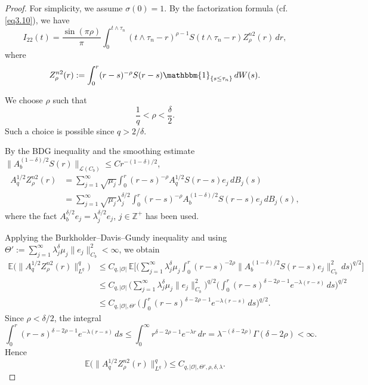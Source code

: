 \documentclass[10pt]{article}
\numberwithin{figure}{section}
\numberwithin{equation}{section}
\newcommand{\0}{{\theta}}
\begin{document}
\begin{proof}
For simplicity, we assume $\sigma(0)=1$. By the factorization formula (cf. \eqref{eq3.10}), we have
$$
I_{22}(t)=\frac{\sin(\pi\rho)}{\pi}\int_0^{t\wedge\tau_n}(t\wedge\tau_n-r)^{\rho-1}S(t\wedge\tau_n-r)Z_\rho^{n2}(r)\,dr,
$$
where
$$
Z_\rho^{n2}(r):=\int_0^r(r-s)^{-\rho}S(r-s)\mathbbm{1}_{\{s\le\tau_n\}}\,dW(s).
$$

We choose $\rho$ such that
$$
\frac1q<\rho<\frac{\delta}{2}.
$$
Such a choice is possible since $q>2/\delta$.

By the BDG inequality and the smoothing estimate
$\|A_b^{(1-\delta)/2}S(r)\|_{\mathcal L(C_b)}\le C r^{-(1-\delta)/2}$,
\begin{align*}
A_q^{1/2}Z_\rho^{n2}(r) 
&= \sum_{j=1}^\infty\sqrt{\mu_j}\int_0^r(r-s)^{-\rho} A_q^{1/2}S(r-s)e_j \,dB_j(s)\\
&=\sum_{j=1}^\infty\sqrt{\mu_j}\lambda_j^{\delta/2}\int_0^r(r-s)^{-\rho} A_b^{(1-\delta)/2}S(r-s)e_j \,dB_j(s),
\end{align*}
where the fact $A_b^{\delta/2}e_j=\lambda_j^{\delta/2}e_j$, $j\in\mathbb Z^+$ has been used.

Applying the Burkholder--Davis--Gundy inequality and using $\Theta':=\sum_{j=1}^\infty\lambda_j^\delta\mu_j\|e_j\|_{C_b}^2<\infty$, we obtain
\begin{align*}
\mathbb{E}\big(\|A_q^{1/2}Z_\rho^{n2}(r)\|_{L^q}^q\big)
&\le C_{q,|\mathcal O|}\,\mathbb{E}\Bigg[\Bigg(
\sum_{j=1}^\infty\lambda_j^\delta\mu_j\int_0^r(r-s)^{-2\rho}
\|A_b^{(1-\delta)/2}S(r-s)e_j\|_{C_b}^2\,ds
\Bigg)^{q/2}\Bigg] \\
&\le C_{q,|\mathcal O|}\,
\Bigg(\sum_{j=1}^{\infty}\lambda_j^\delta\mu_j\|e_j\|_{C_b}^2\Bigg)^{q/2}
\Bigg(\int_0^r(r-s)^{\delta-2\rho-1}e^{-\lambda(r-s)}\,ds\Bigg)^{q/2}\\
&\le C_{q,|\mathcal O|,\Theta'}\,
\Bigg(\int_0^r(r-s)^{\delta-2\rho-1}e^{-\lambda(r-s)}\,ds\Bigg)^{q/2}.
\end{align*}
Since $\rho<\delta/2$, the integral
$$
\int_0^r(r-s)^{\delta-2\rho-1}e^{-\lambda(r-s)}\,ds
\le \int_0^\infty r^{\delta-2\rho-1}e^{-\lambda r}\,dr
= \lambda^{-(\delta-2\rho)}\Gamma(\delta-2\rho)<\infty.
$$Hence
$$
\mathbb{E}\big(\|A_q^{1/2}Z_\rho^{n2}(r)\|_{L^q}^q\big)
\le C_{q,|\mathcal O|,\Theta',\rho,\delta,\lambda}.
$$


\end{proof}
\end{document}

